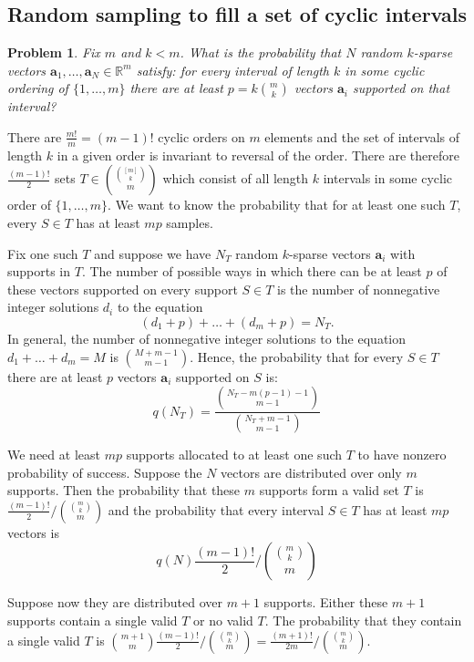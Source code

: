 \documentclass[journal, onecolumn]{IEEEtran}
\newtheorem{problem}{Problem}
\begin{document}
\subsection{ Random sampling to fill a set of cyclic intervals }
\begin{problem}
Fix $m$ and $k < m$. What is the probability that $N$ random $k$-sparse vectors $\mathbf{a}_1, \ldots, \mathbf{a}_N \in \mathbb{R}^m$ satisfy: for every interval of length $k$ in some cyclic ordering of $\{1, \ldots, m\}$ there are at least $p = k{m \choose k}$ vectors $\mathbf{a}_i$ supported on that interval?
\end{problem}

There are $\frac{m!}{m} = (m-1)!$ cyclic orders on $m$ elements and the set of intervals of length $k$ in a given order is invariant to reversal of the order. There are therefore $\frac{(m-1)!}{2}$ sets $T \in { {[m] \choose k} \choose m}$ which consist of all length $k$ intervals in some cyclic order of $\{1, \ldots, m\}$. We want to know the probability that for at least one such $T$, every $S \in T$ has at least $mp$ samples.

Fix one such $T$ and suppose we have $N_T$ random $k$-sparse vectors $\mathbf{a}_i$ with supports in $T$. The number of possible ways in which there can be at least $p$ of these vectors supported on every support $S \in T$ is the number of nonnegative integer solutions $d_i$ to the equation
\[ (d_1 + p) + \ldots + (d_m + p) = N_T.\]
%
In general, the number of nonnegative integer solutions to the equation $d_1 + \ldots + d_m = M$ is ${M+m-1 \choose m-1}$. Hence, the probability that for every $S \in T$ there are at least $p$ vectors $\mathbf{a}_i$ supported on $S$ is:
\[ q(N_T) = \frac{ { N_T-m(p-1)-1 \choose m-1 } }{ {N_T+m-1 \choose m-1} } \]

We need at least $mp$ supports allocated to at least one such $T$ to have nonzero probability of success. Suppose the $N$ vectors are distributed over only $m$ supports. Then the probability that these $m$ supports form a valid set $T$ is $\frac{(m-1)!}{2} / { {m \choose k} \choose m}$ and the probability that every interval $S \in T$ has at least $mp$ vectors is 
\[ q(N) \frac{(m-1)!}{2} / { {m \choose k} \choose m}\]

Suppose now they are distributed over $m+1$ supports. Either these $m+1$ supports contain a single valid $T$ or no valid $T$. The probability that they contain a single valid $T$ is ${m+1 \choose m} \frac{(m-1)!}{2} / { {m \choose k} \choose m} = \frac{(m+1)!}{2m} / { {m \choose k} \choose m}$.
\end{document}
